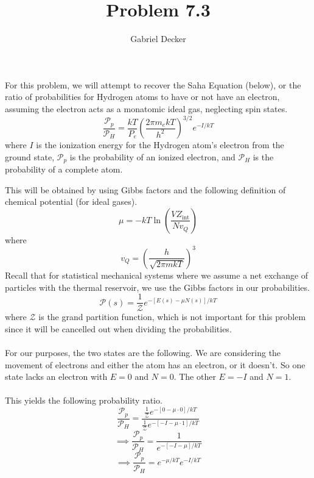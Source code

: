 \documentclass[12pt]{article}
\title{Problem 7.3}
\author{Gabriel Decker}
\begin{document}
\maketitle
\begin{flushleft}

For this problem, we will attempt to recover the Saha Equation (below), or the ratio of probabilities for Hydrogen atoms to have or not have an electron, assuming the electron acts as a monatomic ideal gas, neglecting spin states.
\begin{equation}
    \frac{\mathcal{P}_p}{\mathcal{P}_H}=\frac{kT}{P_e}\left(\frac{2\pi m_ekT}{h^2}\right)^{3/2}e^{-I/kT}
\end{equation}
where $I$ is the ionization energy for the Hydrogen atom's electron from the ground state, $\mathcal{P}_p$ is the probability of an ionized electron, and $\mathcal{P}_H$ is the probability of a complete atom.

This will be obtained by using Gibbs factors and the following definition of chemical potential (for ideal gases).
\begin{equation}
    \mu=-kT\ln\left(\frac{VZ_\text{int}}{Nv_Q}\right)
\end{equation}
where
\begin{equation}
    v_Q=\left(\frac{h}{\sqrt{2\pi mkT}}\right)^3
\end{equation}
Recall that for statistical mechanical systems where we assume a net exchange of particles with the thermal reservoir, we use the Gibbs factors in our probabilities.
\begin{equation}
    \mathcal{P}(s)=\frac{1}{\mathcal{Z}}e^{-[E(s)-\mu N(s)]/kT}
\end{equation}
where $\mathcal{Z}$ is the grand partition function, which is not important for this problem since it will be cancelled out when dividing the probabilities.\\~\\

For our purposes, the two states are the following.
We are considering the movement of electrons and either the atom has an electron, or it doesn't.
So one state lacks an electron with $E=0$ and $N=0$.
The other $E=-I$ and $N=1$.\\~\\

This yields the following probability ratio.
$$\frac{\mathcal{P}_p}{\mathcal{P}_H}=\frac{\frac{1}{\mathcal{Z}}e^{-[0-\mu\cdot0]/kT}}{\frac{1}{\mathcal{Z}}e^{-[-I-\mu\cdot1]/kT}}$$
$$\implies\frac{\mathcal{P}_p}{\mathcal{P}_H}=\frac{1}{e^{-[-I-\mu]/kT}}$$
$$\implies\frac{\mathcal{P}_p}{\mathcal{P}_H}=e^{-\mu/kT}e^{-I/kT}$$\\~\\


\end{flushleft}
\end{document}
